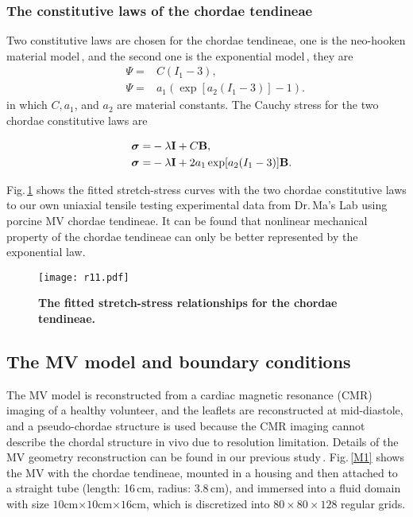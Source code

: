 \documentclass[fleqn,10pt]{wlscirep}
\def\bm#1{\mbox{\boldmath{$#1$}}}
\begin{document}
\subsubsection*{The constitutive laws of the chordae tendineae}
Two constitutive laws are chosen for the chordae tendineae, one is the neo-hooken material model\,\cite{Hao2014A}, and the second one is the exponential model\,\cite{Prot2009Finite}, they are
\begin{equation}
\begin{split}
&&\Psi=&C(I_{1}-3), \\
&&\Psi=&a_{1}\left(\exp[a_{2}(I_{1}-3)]-1\right) .
\label{eq:ch}
\end{split}
\end{equation}
in which $C, a_1$, and $a_2$ are material constants. The Cauchy stress for the two chordae constitutive laws are

\begin{equation}
\begin{split}
&&\bm{\sigma}=&-\lambda\mathbf{I}+C\mathbf{B},\\
&&\bm{\sigma}=&-\lambda\mathbf{I}+2a_{1}\exp[a_{2}(I_{1}-3)]\mathbf{B}.
\end{split}
\label{eq:WW1}
\end{equation}

Fig.\,\ref{fig:chd} shows the fitted stretch-stress curves with the two chordae constitutive laws to our own uniaxial tensile testing experimental data  from Dr.\,Ma's Lab using porcine MV chordae tendineae. It can be found that nonlinear mechanical property of the chordae tendineae can only be better represented by the exponential law. 

\begin{figure}[!ht]
	\centering
	\texttt{[image: r11.pdf]}
	\renewcommand{\figurename}{Figure}
	\caption{{\bf The fitted stretch-stress relationships for the chordae tendineae.}}
	\label{fig:chd}
\end{figure}

\subsection*{The MV model and boundary conditions}
The MV model is reconstructed from a cardiac magnetic resonance (CMR) imaging of a healthy volunteer, and the leaflets are reconstructed at mid-diastole, and a pseudo-chordae structure is used because the CMR imaging cannot describe the chordal structure in vivo due to resolution limitation. Details of the MV geometry reconstruction can be found in our previous study\,\cite{Hao2014A,Xingshuang2013Image}. Fig.\,\ref{M1} shows the MV with the chordae tendineae, mounted in a housing and then attached to a straight tube (length: 16\,cm, radius: 3.8\,cm), and immersed into a fluid domain with size  $10$cm$\times 10$cm$\times 16$cm, which is discretized into $80\times 80\times 128$ regular grids.
\end{document}
